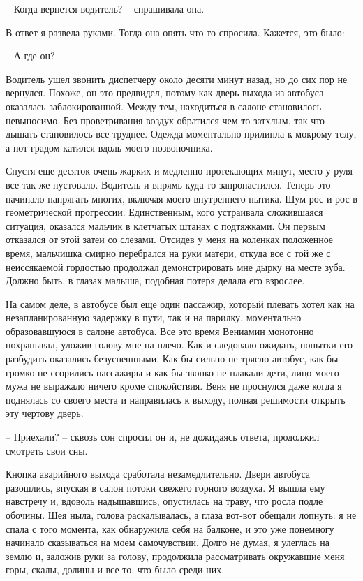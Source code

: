 \documentclass[
]{book}
\begin{document}
-- Когда вернется водитель? -- спрашивала она.

В ответ я развела руками. Тогда она опять что-то спросила. Кажется, это было:

-- А где он?

Водитель ушел звонить диспетчеру около десяти минут назад, но до сих пор не вернулся. Похоже, он это предвидел, потому как дверь выхода из автобуса оказалась заблокированной. Между тем, находиться в салоне становилось невыносимо. Без проветривания воздух обратился чем-то затхлым, так что дышать становилось все труднее. Одежда моментально прилипла к мокрому телу, а пот градом катился вдоль моего позвоночника.

Спустя еще десяток очень жарких и медленно протекающих минут, место у руля все так же пустовало. Водитель и впрямь куда-то запропастился. Теперь это начинало напрягать многих, включая моего внутреннего нытика. Шум рос и рос в геометрической прогрессии. Единственным, кого устраивала сложившаяся ситуация, оказался мальчик в клетчатых штанах с подтяжками. Он первым отказался от этой затеи со слезами. Отсидев у меня на коленках положенное время, мальчишка смирно перебрался на руки матери, откуда все с той же с неиссякаемой гордостью продолжал демонстрировать мне дырку на месте зуба. Должно быть, в глазах малыша, подобная потеря делала его взрослее.

На самом деле, в автобусе был еще один пассажир, который плевать хотел как на незапланированную задержку в пути, так и на парилку, моментально образовавшуюся в салоне автобуса. Все это время Вениамин монотонно похрапывал, уложив голову мне на плечо. Как и следовало ожидать, попытки его разбудить оказались безуспешными. Как бы сильно не трясло автобус, как бы громко не ссорились пассажиры и как бы звонко не плакали дети, лицо моего мужа не выражало ничего кроме спокойствия. Веня не проснулся даже когда я поднялась со своего места и направилась к выходу, полная решимости открыть эту чертову дверь.

-- Приехали? -- сквозь сон спросил он и, не дожидаясь ответа, продолжил смотреть свои сны.

Кнопка аварийного выхода сработала незамедлительно. Двери автобуса разошлись, впуская в салон потоки свежего горного воздуха. Я вышла ему навстречу и, вдоволь надышавшись, опустилась на траву, что росла подле обочины. Шея ныла, голова раскалывалась, а глаза вот-вот обещали лопнуть: я не спала с того момента, как обнаружила себя на балконе, и это уже понемногу начинало сказываться на моем самочувствии. Долго не думая, я улеглась на землю и, заложив руки за голову, продолжила рассматривать окружавшие меня горы, скалы, долины и все то, что было среди них.
\end{document}
